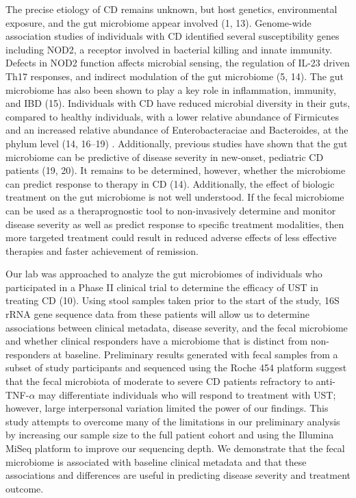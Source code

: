 \documentclass[11pt,]{article}
\begin{document}
The precise etiology of CD remains unknown, but host genetics,
environmental exposure, and the gut microbiome appear involved (1, 13).
Genome-wide association studies of individuals with CD identified
several susceptibility genes including NOD2, a receptor involved in
bacterial killing and innate immunity. Defects in NOD2 function affects
microbial sensing, the regulation of IL-23 driven Th17 responses, and
indirect modulation of the gut microbiome (5, 14). The gut microbiome
has also been shown to play a key role in inflammation, immunity, and
IBD (15). Individuals with CD have reduced microbial diversity in their
guts, compared to healthy individuals, with a lower relative abundance
of Firmicutes and an increased relative abundance of Enterobacteraciae
and Bacteroides, at the phylum level (14, 16--19) . Additionally,
previous studies have shown that the gut microbiome can be predictive of
disease severity in new-onset, pediatric CD patients (19, 20). It
remains to be determined, however, whether the microbiome can predict
response to therapy in CD (14). Additionally, the effect of biologic
treatment on the gut microbiome is not well understood. If the fecal
microbiome can be used as a theraprognostic tool to non-invasively
determine and monitor disease severity as well as predict response to
specific treatment modalities, then more targeted treatment could result
in reduced adverse effects of less effective therapies and faster
achievement of remission.

Our lab was approached to analyze the gut microbiomes of individuals who
participated in a Phase II clinical trial to determine the efficacy of
UST in treating CD (10). Using stool samples taken prior to the start of
the study, 16S rRNA gene sequence data from these patients will allow us
to determine associations between clinical metadata, disease severity,
and the fecal microbiome and whether clinical responders have a
microbiome that is distinct from non-responders at baseline. Preliminary
results generated with fecal samples from a subset of study participants
and sequenced using the Roche 454 platform suggest that the fecal
microbiota of moderate to severe CD patients refractory to
anti-TNF-\({\alpha}\) may differentiate individuals who will respond to
treatment with UST; however, large interpersonal variation limited the
power of our findings. This study attempts to overcome many of the
limitations in our preliminary analysis by increasing our sample size to
the full patient cohort and using the Illumina MiSeq platform to improve
our sequencing depth. We demonstrate that the fecal microbiome is
associated with baseline clinical metadata and that these associations
and differences are useful in predicting disease severity and treatment
outcome.
\end{document}
